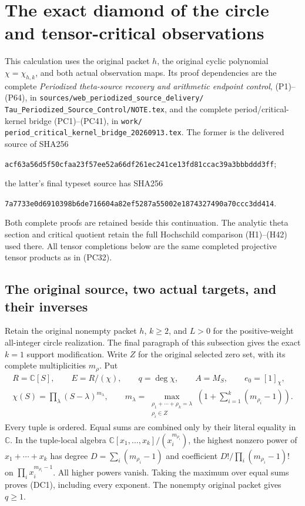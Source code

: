 \documentclass{article}
\begin{document}
\maketitle
\section{The exact diamond of the circle and tensor-critical observations}
\label{sec:circle-critical-diamond}

This calculation uses the original packet $h$, the original cyclic
polynomial $\chi=\chi_{h,k}$, and both actual observation maps.  Its
proof dependencies are the complete \emph{Periodized theta-source
recovery and arithmetic endpoint control}, (P1)--(P64), in
\texttt{sources/web\_periodized\_source\_delivery/}
\texttt{Tau\_Periodized\_Source\_Control/NOTE.tex}, and the complete
period/critical-kernel bridge (PC1)--(PC41), in
\texttt{work/}\allowbreak
\texttt{period\_critical\_kernel\_bridge\_20260913.tex}.
The former is the delivered source of SHA256
\par\noindent
\texttt{acf63a56d5f50cfaa23f57ee52a66df261ec241ce13fd81ccac39a3bbbddd3ff};
\par\noindent
the latter's final typeset source has SHA256
\par\noindent
\texttt{7a7733e0d6910398b6de716604a82ef5287a55002e1874327490a70ccc3dd414}.
\par\noindent
Both complete proofs are retained beside this continuation.  The
analytic theta section and critical quotient retain the full
Hochschild comparison (H1)--(H42) used there.  All tensor completions
below are the same completed projective tensor products as in (PC32).

\subsection{The original source, two actual targets, and their inverses}

Retain the original nonempty packet $h$, $k\ge2$, and $L>0$
for the positive-weight all-integer circle
realization.  The final paragraph of this subsection gives the exact
$k=1$ support modification.  Write $Z$ for the original selected zero
set, with its complete multiplicities $m_\rho$.  Put
\[
 \begin{gathered}
 R=\mathbb C[S],\qquad E=R/(\chi),\qquad q=\deg\chi,\qquad
 A=M_S,\qquad e_0=[1]_\chi,\\
 \chi(S)=\prod_{\lambda}(S-\lambda)^{m_\lambda},\qquad
 m_\lambda=\max_{\substack{\rho_1+\cdots+\rho_k=\lambda\\\rho_i\in Z}}
       \left(1+\sum_{i=1}^k(m_{\rho_i}-1)\right).
 \end{gathered}
 \tag{DC1}
\]
Every tuple is ordered.  Equal sums are combined only by their literal
equality in $\mathbb C$.  In the tuple-local algebra
$\mathbb C[x_1,\ldots,x_k]/(x_i^{m_{\rho_i}})$, the highest nonzero
power of $x_1+\cdots+x_k$ has degree
$D=\sum_i(m_{\rho_i}-1)$ and coefficient
$D!/\prod_i(m_{\rho_i}-1)!$ on
$\prod_i x_i^{m_{\rho_i}-1}$.  All higher powers vanish.  Taking the
maximum over equal sums proves (DC1), including every exponent.
The nonempty original packet gives $q\ge1$.
\end{document}
